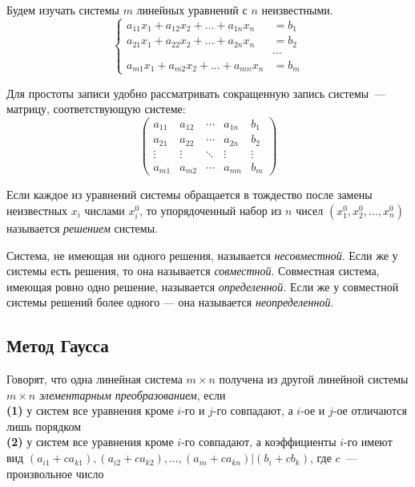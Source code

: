 
Будем изучать системы $m$ линейных уравнений с $n$ неизвестными.
\[\left\{\begin{aligned}
    a_{11} x_1 + a_{12} x_2 + \dots + a_{1n} x_n
&=
    b_1
\\
    a_{21} x_1 + a_{22} x_2 + \dots + a_{2n} x_n
&=
    b_2
\\
    &\cdots
\\
    a_{m1} x_1 + a_{m2} x_2 + \dots + a_{mn} x_n
&=
    b_m
\end{aligned}\right.\]

Для простоты записи удобно рассматривать сокращенную запись системы~---
матрицу, соответствующую системе:
\[\left(\begin{array}{cccc|c}
    a_{11} & a_{12} & \cdots & a_{1n} & b_1
\\
    a_{21} & a_{22} & \cdots & a_{2n} & b_2
\\
    \vdots & \vdots & \ddots & \vdots & \vdots
\\
    a_{m1} & a_{m2} & \cdots & a_{mn} & b_m
\end{array}\right)\]

Если каждое из уравнений системы обращается в тождество после замены
неизвестных $x_i$ числами $x_i^0$, то упорядоченный набор из $n$ чисел
$(x_1^0, x_2^0, \ldots, x_n^0)$ называется \emph{решением} системы.

Система, не имеющая ни одного решения, называется \emph{несовместной}.
Если же у системы есть решения, то она называется \emph{совместной}.
Совместная система, имеющая ровно одно решение, называется
\emph{определенной}.
Если же у совместной системы решений более одного --- она называется
\emph{неопределенной}.

\subsection*{Метод Гаусса}

Говорят, что одна линейная система $m \times n$ получена из другой линейной
системы $m \times n$ \emph{элементарным преобразованием}, если
\\\textbf{(1)}
у систем все уравнения кроме $i$-го и $j$-го совпадают, а $i$-ое и $j$-ое
отличаются лишь порядком
\\\textbf{(2)}
у систем все уравнения кроме $i$-го совпадают, а коэффициенты $i$-го имеют
вид
\(
    (a_{i1} + c a_{k1}),
    (a_{i2}+c a_{k2}),
    \ldots,
    (a_{in}+c a_{kn})
|
    (b_i+c b_k)
\),
где $c$~--- произвольное число

